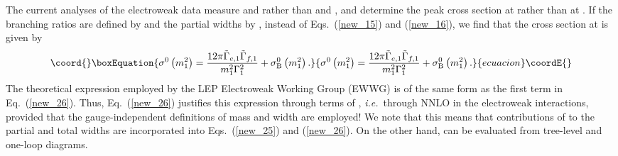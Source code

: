 \documentclass[a4paper,12pt]{article}
\begin{document}
The current analyses of the electroweak data measure
\coordHE{} and \coordHE{}
rather than \coordHE{} and \coordHE{} \cite{si_1}, and determine the peak cross
section at \coordHE{} rather than at \coordHE{}.
If the branching ratios are defined by
\coordHE{} and the partial
widths by \coordHE{}, instead of
Eqs.~(\ref{new_15}) and (\ref{new_16}), we find that the cross section at
\coordHE{} is given by
\begin{equation}\coord{}\boxEquation{
\label{new_26}
\sigma^0\left(m^2_1\right)
=\frac{12\pi\tilde\Gamma_{e,1}\tilde\Gamma_{f,1}}{m^2_1\Gamma^2_1}
+\sigma_{\rm B}^0\left(m^2_1\right). 
}{
\sigma^0\left(m^2_1\right)
=\frac{12\pi\tilde\Gamma_{e,1}\tilde\Gamma_{f,1}}{m^2_1\Gamma^2_1}
+\sigma_{\rm B}^0\left(m^2_1\right). 
}{ecuacion}\coordE{}\end{equation}
The theoretical expression employed by the LEP Electroweak Working Group
(EWWG) \cite{ewwg} is of the same form as the first term in
Eq.~(\ref{new_26}).
Thus, Eq.~(\ref{new_26}) justifies this expression through terms of \coordHE{},
{\it i.e.}\ through NNLO in the electroweak interactions, 
provided that the gauge-independent definitions of
mass and width are employed!
We note that this means that contributions of \coordHE{} to the partial and
total widths are incorporated into Eqs.~(\ref{new_25}) and (\ref{new_26}).
On the other hand, \coordHE{} can be evaluated from tree-level and
one-loop diagrams.
\end{document}
